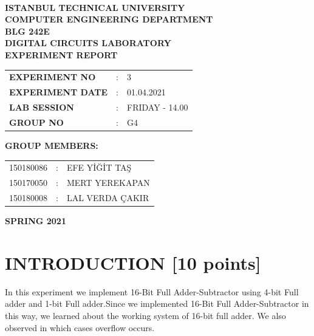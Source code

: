 \documentclass[pdftex,12pt,a4paper]{article}
\begin{document}
\begin{titlepage}
\begin{center}
\textbf{}\\
\textbf{\Large{ISTANBUL TECHNICAL UNIVERSITY}}\\
\vspace{0.5cm}
\textbf{\Large{COMPUTER ENGINEERING DEPARTMENT}}\\
\vspace{2cm}
\textbf{\Large{BLG 242E\\ DIGITAL CIRCUITS LABORATORY\\ EXPERIMENT REPORT}}\\
\vspace{2.8cm}
\begin{table}[ht]
\centering
\Large{
\begin{tabular}{lcl}
\textbf{EXPERIMENT NO}  & : & 3 \\
\textbf{EXPERIMENT DATE}  & : & 01.04.2021 \\
\textbf{LAB SESSION}  & : & FRIDAY - 14.00 \\
\textbf{GROUP NO}  & : & G4 \\
\end{tabular}}
\end{table}
\vspace{1cm}
\textbf{\Large{GROUP MEMBERS:}}\\
\begin{table}[ht]
\centering
\Large{
\begin{tabular}{rcl}
150180086  & : & EFE YİĞİT TAŞ \\
150170050  & : & MERT  YEREKAPAN \\
150180008  & : & LAL VERDA ÇAKIR \\
\end{tabular}}
\end{table}
\vspace{2.8cm}
\textbf{\Large{SPRING 2021}}

\end{center}

\end{titlepage}

\thispagestyle{empty}
\setcounter{tocdepth}{4}
\tableofcontents
\clearpage

\setcounter{page}{1} 

\section{INTRODUCTION [10 points]}
In this experiment we implement 16-Bit Full Adder-Subtractor  using 4-bit Full adder and 1-bit Full adder.Since we implemented 16-Bit Full Adder-Subtractor in this way, we learned about the working system of 16-bit full adder. We also observed in which cases overflow occurs.
\end{document}
